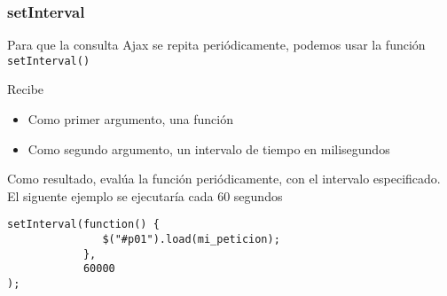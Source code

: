 \documentclass[ucs]{beamer}
\begin{document}
\begin{frame}[fragile]
\frametitle{setInterval}

Para que la consulta Ajax se repita periódicamente, podemos
usar la función 
\verb|setInterval()|

Recibe
\begin{itemize}
\item
Como primer argumento, una función

\item
Como segundo argumento, un intervalo de tiempo en milisegundos

\end{itemize}

Como resultado, evalúa la función periódicamente, con el intervalo
especificado.
El siguente ejemplo se ejecutaría cada 60 segundos

  \begin{scriptsize}
  \begin{verbatim}
setInterval(function() { 
               $("#p01").load(mi_peticion);
            }, 
            60000
);
  \end{verbatim}
  \end{scriptsize}

\end{frame}
\end{document}
